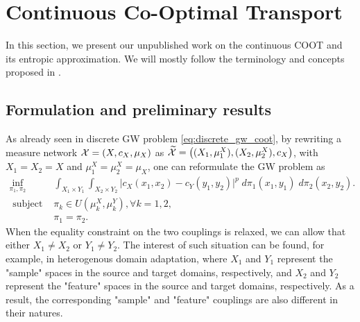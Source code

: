 \section{Continuous Co-Optimal Transport}

In this section, we present our unpublished work on the continuous COOT and its entropic approximation.
We will mostly follow the terminology and concepts proposed in \citep{Chowdhury21b}.

\subsection{Formulation and preliminary results}

As already seen in discrete GW problem \eqref{eq:discrete_gw_coot},
by rewriting a measure network $\mathcal X = (X, c_X, \mu_X)$ as
$\widetilde{\mathcal X} = \big((X_1, \mu_1^X), (X_2, \mu_2^X), c_X \big)$, with
$X_1 = X_2 = X$ and $\mu_1^X = \mu^X_2 = \mu_X$, one can reformulate the GW problem as
\begin{equation}
  \begin{split}
    \inf_{\pi_1, \pi_2}
    &\int_{X_1 \times Y_1} \int_{X_2 \times Y_2}
    \big\vert c_X(x_1, x_2) - c_Y(y_1, y_2) \big\vert^p \; d\pi_1(x_1, y_1) \; d\pi_2(x_2, y_2). \\
    \text{ subject to: } &\pi_k \in U(\mu_k^X, \mu_k^Y), \forall k = 1,2, \\
    &\pi_1 = \pi_2.
  \end{split}
\end{equation}
When the equality constraint on the two couplings is relaxed,
we can allow that either $X_1 \neq X_2$ or $Y_1 \neq Y_2$.
The interest of such situation can be found, for example, in heterogenous domain adaptation,
where $X_1$ and $Y_1$ represent the "sample" spaces in the source and target domains, respectively,
and $X_2$ and $Y_2$ represent the "feature" spaces in the source and target domains, respectively.
As a result, the corresponding "sample" and "feature" couplings are also different in their natures.


